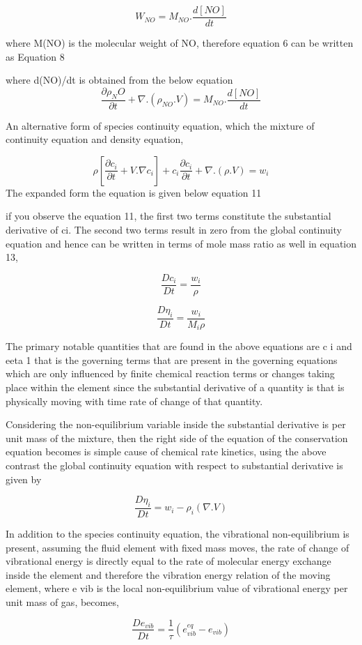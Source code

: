\large\[W_{NO} = M_{NO}.\frac{d[NO]}{dt}\]\vspace{3mm}

where M(NO) is the molecular weight of NO, therefore equation 6 can be written as \vspace{3mm}
Equation 8 \vspace{3mm}

where d(NO)/dt is obtained from the below equation
\vspace{3mm}
\large\[\frac{\partial \rho_NO }{\partial t} + \nabla .(\rho_{NO}.V)= M_{NO}.\frac{d[NO]}{dt}\]

An alternative form of species continuity equation, which the mixture of continuity equation and density equation, 

\vspace{3mm}
\large\[\rho[\frac{\partial c_i }{\partial t}+V.\nabla c_i] + c_i \frac{\partial c_i }{\partial t}+\nabla .(\rho.V) =w_i\]
The expanded form the equation is given below 
\vspace{3mm}
equation 11

if you observe the equation 11, the first two terms constitute the substantial derivative of ci. The second two terms result in zero from the global continuity equation and hence can be written in terms of mole mass ratio as well in equation 13,

\large\[\frac{D c_i}{D t}= \frac{w_i}{\rho}\]

\vspace{3mm}
\large\[\frac{D \eta_i}{D t}= \frac{w_i}{M_i \rho}\]

The primary notable quantities that are found in the above equations are c i and eeta 1 that is the governing terms that are present in the governing equations which are only influenced by finite chemical reaction terms or changes taking place within the element since the substantial derivative of a quantity is that is physically moving with time rate of change of that quantity.

Considering the non-equilibrium variable inside the substantial derivative is per unit mass of the mixture, then the right side of the equation of the conservation equation becomes is simple cause of chemical rate kinetics, using the above contrast the global continuity equation with respect to substantial derivative is given by 

\vspace{3mm}
\large\[\frac{D \eta_i}{D t}= w_i - \rho_i(\nabla . V)\]

In addition to the species continuity equation, the vibrational non-equilibrium is present, assuming the fluid element with fixed mass moves, the rate of change of vibrational energy is directly equal to the rate of molecular energy exchange inside the element and therefore the vibration energy relation of the moving element, where e vib is the local non-equilibrium value of vibrational energy per unit mass of gas, becomes,

\vspace{3mm}
\large\[\frac{D e_{vib}}{D t}= \frac{1}{\tau} (e^{eq}_{vib}-e_{vib})\]
\vspace{3mm}